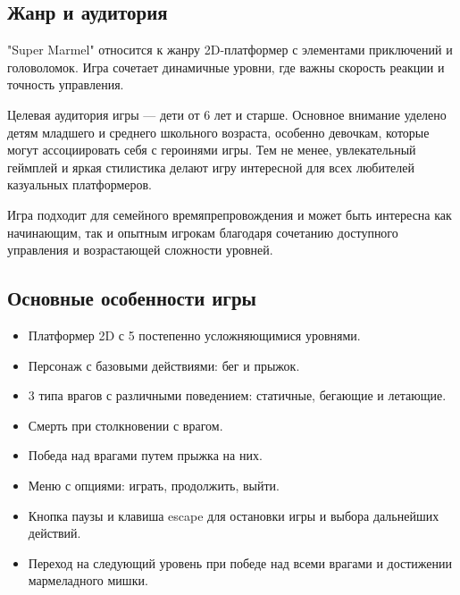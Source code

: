 \documentclass[article,12pt, fleqn]{article}
\begin{document}
\begin{itemize}
\subsection{Жанр и аудитория}
\par "Super Marmel" относится к жанру 2D-платформер с элементами приключений и головоломок. Игра сочетает динамичные уровни, где важны скорость реакции и точность управления.
\par Целевая аудитория игры — дети от 6 лет и старше. Основное внимание уделено детям младшего и среднего школьного возраста, особенно девочкам, которые могут ассоциировать себя с героинями игры. Тем не менее, увлекательный геймплей и яркая стилистика делают игру интересной для всех любителей казуальных платформеров.
\par Игра подходит для семейного времяпрепровождения и может быть интересна как начинающим, так и опытным игрокам благодаря сочетанию доступного управления и возрастающей сложности уровней.

\subsection{Основные особенности игры}
\begin{itemize}
    \item  Платформер 2D с 5 постепенно усложняющимися уровнями.
    \item Персонаж с базовыми действиями: бег и прыжок.
    \item 3 типа врагов с различными поведением: статичные, бегающие и летающие.
    \item Смерть при столкновении с врагом.
    \item Победа над врагами путем прыжка на них.
    \item Меню с опциями: играть, продолжить, выйти.
    \item Кнопка паузы и клавиша escape для остановки игры и выбора дальнейших действий.
    \item Переход на следующий уровень при победе над всеми врагами и достижении мармеладного мишки.
\end{itemize}


\end{itemize}
\end{document}
